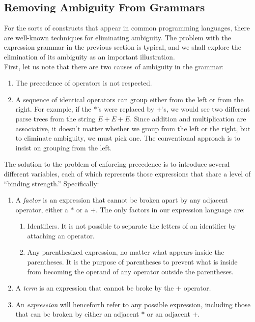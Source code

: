 \documentclass[]{article}
\begin{document}
  \subsection*{Removing Ambiguity From Grammars}
    For the sorts of constructs that appear in common programming languages,
    there are well-known techniques for eliminating ambiguity. The problem with
    the expression grammar in the previous section is typical, and we shall
    explore the elimination of its ambiguity as an important illustration. \\
    \indent First, let us note that there are two causes of ambiguity in the
    grammar:
      \begin{enumerate}
        \item The precedence of operators is not respected.
        \item A sequence of identical operators can group either from the left
        or from the right. For example, if the $*$'s were replaced by $+$'s, we
        would see two different parse trees from the string $E + E + E$. Since
        addition and multiplication are associative, it doesn't matter whether
        we group from the left or the right, but to eliminate ambiguity, we must
        pick one. The conventional approach is to insist on grouping from the
        left.
      \end{enumerate}
    The solution to the problem of enforcing precedence is to introduce several
    different variables, each of which represents those expressions that share a
    level of ``binding strength.'' Specifically:
      \begin{enumerate}
        \item A \emph{factor} is an expression that cannot be broken apart by
        any adjacent operator, either a $*$ or a $+$. The only factors in our
        expression language are:
          \begin{enumerate}
            \item Identifiers. It is not possible to separate the letters of an
            identifier by attaching an operator.
            \item Any parenthesized expression, no matter what appears inside
            the parentheses. It is the purpose of parentheses to prevent what is
            inside from becoming the operand of any operator outside the
            parentheses.
          \end{enumerate}
        \item A \emph{term} is an expression that cannot be broke by the $+$
        operator.
        \item An \emph{expression} will henceforth refer to any possible
        expression, including those that can be broken by either an adjacent $*$
        or an adjacent $+$.
      \end{enumerate}
\end{document}
